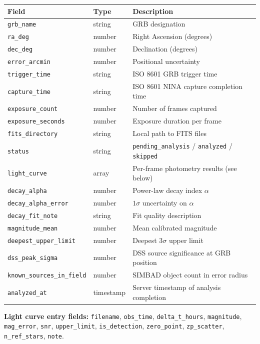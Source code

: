 \documentclass[12pt,a4paper]{article}
\begin{document}
\begin{center}
\begin{tabular}{lll}
\toprule
Field & Type & Description \\
\midrule
\texttt{grb\_name} & string & GRB designation \\
\texttt{ra\_deg} & number & Right Ascension (degrees) \\
\texttt{dec\_deg} & number & Declination (degrees) \\
\texttt{error\_arcmin} & number & Positional uncertainty \\
\texttt{trigger\_time} & string & ISO 8601 GRB trigger time \\
\texttt{capture\_time} & string & ISO 8601 NINA capture completion time \\
\texttt{exposure\_count} & number & Number of frames captured \\
\texttt{exposure\_seconds} & number & Exposure duration per frame \\
\texttt{fits\_directory} & string & Local path to FITS files \\
\texttt{status} & string & \texttt{pending\_analysis} / \texttt{analyzed} / \texttt{skipped} \\
\texttt{light\_curve} & array & Per-frame photometry results (see below) \\
\texttt{decay\_alpha} & number & Power-law decay index $\alpha$ \\
\texttt{decay\_alpha\_error} & number & $1\sigma$ uncertainty on $\alpha$ \\
\texttt{decay\_fit\_note} & string & Fit quality description \\
\texttt{magnitude\_mean} & number & Mean calibrated magnitude \\
\texttt{deepest\_upper\_limit} & number & Deepest 3$\sigma$ upper limit \\
\texttt{dss\_peak\_sigma} & number & DSS source significance at GRB position \\
\texttt{known\_sources\_in\_field} & number & SIMBAD object count in error radius \\
\texttt{analyzed\_at} & timestamp & Server timestamp of analysis completion \\
\bottomrule
\end{tabular}
\end{center}

\textbf{Light curve entry fields:}
\texttt{filename}, \texttt{obs\_time}, \texttt{delta\_t\_hours},
\texttt{magnitude}, \texttt{mag\_error}, \texttt{snr}, \texttt{upper\_limit},
\texttt{is\_detection}, \texttt{zero\_point}, \texttt{zp\_scatter},
\texttt{n\_ref\_stars}, \texttt{note}.
\end{document}
